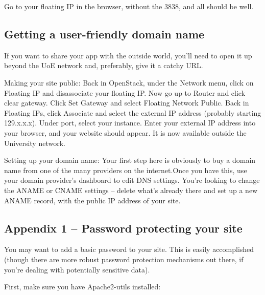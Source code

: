 \documentclass[
]{book}
\begin{document}
Go to your floating IP in the browser, without the 3838, and all should be well.

\hypertarget{getting-a-user-friendly-domain-name}{%
\subsection{Getting a user-friendly domain name}\label{getting-a-user-friendly-domain-name}}

If you want to share your app with the outside world, you'll need to open it up beyond the UoE network and, preferably, give it a catchy URL.

Making your site public: Back in OpenStack, under the Network menu, click on Floating IP and disassociate your floating IP.
Now go up to Router and click clear gateway. Click Set Gateway and select Floating Network Public.
Back in Floating IPs, click Associate and select the external IP address (probably starting 129.x.x.x). Under port, select your instance.
Enter your external IP address into your browser, and your website should appear. It is now available outside the University network.

Setting up your domain name:
Your first step here is obviously to buy a domain name from one of the many providers on the internet.Once you have this, use your domain provider's dashboard to edit DNS settings. You're looking to change the ANAME or CNAME settings -- delete what's already there and set up a new ANAME record, with the public IP address of your site.

\hypertarget{appendix-1-password-protecting-your-site}{%
\subsection{Appendix 1 -- Password protecting your site}\label{appendix-1-password-protecting-your-site}}

You may want to add a basic password to your site. This is easily accomplished (though there are more robust password protection mechanisms out there, if you're dealing with potentially sensitive data).

First, make sure you have Apache2-utils installed:
\end{document}
